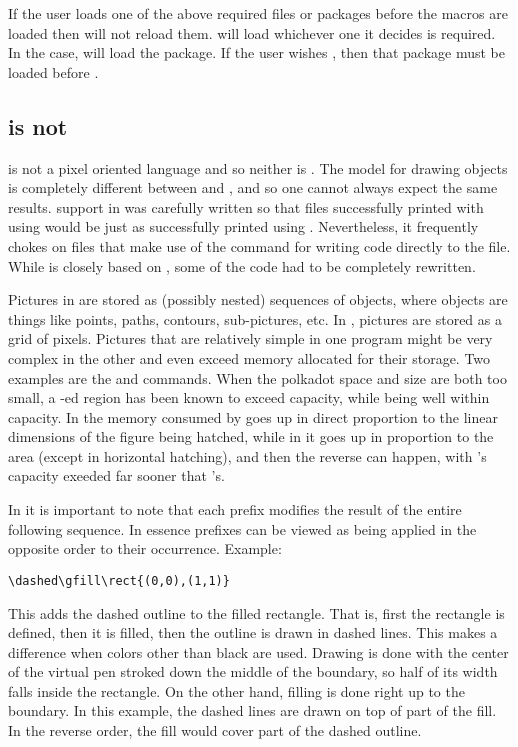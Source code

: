 \documentclass[letterpaper]{article}
\begin{document}
If the user loads one of the above required files or packages before the
\mfp{} macros are loaded then \mfp{} will not reload them. \Mfp{} will
load whichever one it decides is required. In the \LaTeXe{} case, \mfp{}
will load the  package. If the user wishes
, then that package must be loaded before \mfp{}.

\subsection{\CMP{} is not \MF{}}

\PS{} is not a pixel oriented language and so neither is \MP{}. The model
for drawing objects is completely different between \MF{} and \MP{}, and
so one cannot always expect the same results. \CMP{} support in
\mfp{} was carefully written so that files successfully printed
with \mfp{} using \MF{} would be just as successfully printed
using \MP{}. Nevertheless, it frequently chokes on files that make use of
the  command for writing code directly to the  file.
While  is closely based on , some of
the code had to be completely rewritten.

Pictures in \MP{} are stored as (possibly nested) sequences of objects,
where objects are things like points, paths, contours, sub-pictures,
etc. In \MF{}, pictures are stored as a grid of pixels. Pictures that are
relatively simple in one program might be very complex in the other and
even exceed memory allocated for their storage. Two examples are the
 and  commands. When the polkadot space and size
are both too small, a -ed region has been known to exceed
\MP{} capacity, while being well within \MF{} capacity. In \MP{} the
memory consumed by  goes up in direct proportion to the linear
dimensions of the figure being hatched, while in \MF{} it goes up in
proportion to the area (except in horizontal hatching), and then the
reverse can happen, with \MF{}'s capacity exeeded far sooner that \MP{}'s.

In \MP{} it is important to note that each
prefix modifies the result of the entire following sequence. In essence
prefixes can be viewed as being applied in the opposite order to their
occurrence. Example:
\begin{verbatim}
\dashed\gfill\rect{(0,0),(1,1)}
\end{verbatim}
This adds the dashed outline to the filled rectangle. That is, first the
rectangle is defined, then it is filled, then the outline is drawn in
dashed lines. This makes a difference when colors other than black are
used. Drawing is done with the center of the virtual pen stroked down
the middle of the boundary, so half of its width falls inside the
rectangle. On the other hand, filling is done right up to the boundary.
In this example, the dashed lines are drawn on top of part of the fill.
In the reverse order, the fill would cover part of the dashed outline.
\end{document}
